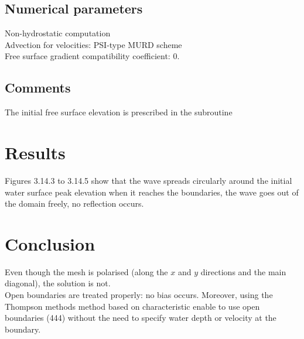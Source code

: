 \subsection{Numerical parameters}
%
Non-hydrostatic computation\\
Advection for velocities: PSI-type MURD scheme\\
Free surface gradient compatibility coefficient: 0.
%
\subsection{Comments}
%
The initial free surface elevation is prescribed in the
 subroutine
%
%
%
\section{Results}
%
Figures 3.14.3 to 3.14.5 show that the wave spreads circularly around
the initial water surface peak elevation when it reaches the boundaries,
the wave goes out of the domain freely, no reflection occurs.
%
\section{Conclusion}
%
Even though the mesh is polarised (along the $x$ and $y$ directions and
the main diagonal), the solution is not.\\
Open boundaries are treated properly: no bias occurs.
Moreover, using the Thompson methods method based on characteristic
enable to use open boundaries (444) without the need to specify water
depth or velocity at the boundary.
%
%
